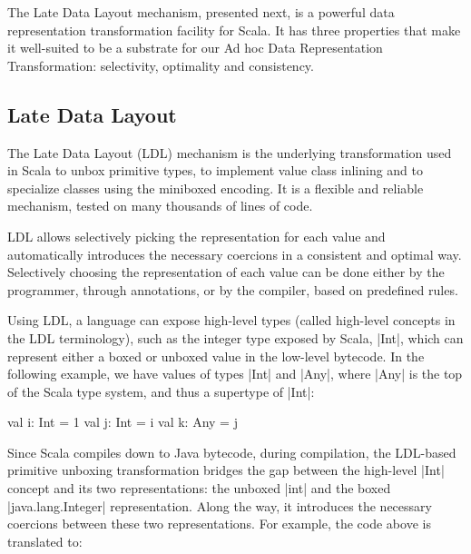 The Late Data Layout mechanism, presented next, is a powerful data
representation transformation facility for Scala.  It has three
properties that make it well-suited to be a substrate for our Ad hoc
Data Representation Transformation: selectivity, optimality and
consistency.


\subsection{Late Data Layout}

The Late Data Layout (LDL) mechanism \cite{ldl} is the underlying transformation used in Scala to unbox primitive types, to implement value class inlining and to specialize classes using the miniboxed encoding. It is a flexible and reliable mechanism, tested on many thousands of lines of code. %

LDL allows selectively picking the representation for each value and automatically introduces the necessary coercions in a consistent and optimal way. Selectively choosing the representation of each value can be done either by the programmer, through annotations, or by the compiler, based on predefined rules.

Using LDL, a language can expose high-level types (called high-level concepts in the LDL terminology), such as the integer type exposed by Scala, |Int|, which can represent either a boxed or unboxed value in the low-level bytecode. In the following example, we have values of types |Int| and |Any|, where |Any| is the top of the Scala type system, and thus a supertype of |Int|:

\begin{lstlisting-nobreak}
val i: Int = 1
val j: Int = i
val k: Any = j
\end{lstlisting-nobreak}

Since Scala compiles down to Java bytecode, during compilation, the LDL-based primitive unboxing transformation bridges the gap between the high-level |Int| concept and its two representations: the unboxed |int| and the boxed |java.lang.Integer| representation. Along the way, it introduces the necessary coercions between these two representations. For example, the code above is translated to:

